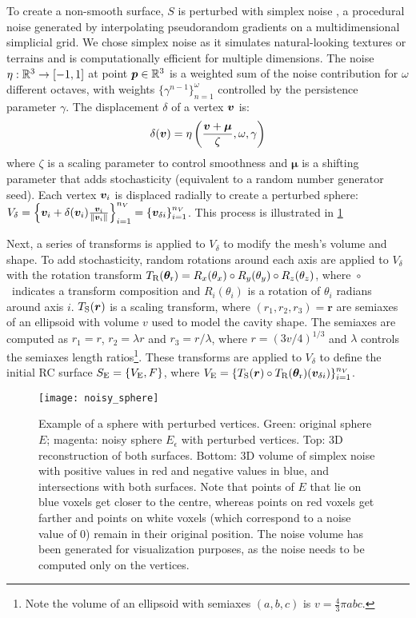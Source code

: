 To create a non-smooth surface, $S$ is perturbed with simplex noise \cite{perlin_improving_2002}, a procedural noise generated by interpolating pseudorandom gradients on a multidimensional simplicial grid.
We chose simplex noise as it simulates natural-looking textures or terrains and is computationally efficient for multiple dimensions.
The noise $\eta : \mathbb{R}^3 \to [-1, 1]$ at point $\bm{p} \in \mathbb{R}^3$ is a weighted sum of the noise contribution for $\omega$ different octaves, with weights $\{\gamma ^ {n - 1}\}_{n = 1}^{\omega}$ controlled by the persistence parameter $\gamma$.
The displacement $\delta$ of a vertex $\bm{v}$ is:
\begin{equation}
  \delta(\bm{v})
  = \eta \left( \frac{\bm{v} + \bm{\mu} }{\zeta}, \omega, \gamma \right)
\end{equation}
where
$\zeta$ is a scaling parameter to control smoothness
and $\bm{\mu}$ is a shifting parameter that adds stochasticity
(equivalent to a random number generator seed).
%
Each vertex $\bm{v}_i$ is displaced radially to create a perturbed sphere:
$
V_{\delta}
  = \left\{
  \bm{v}_i
  + \delta(\bm{v}_i)
  \frac{\bm{v}_i}{\|\bm{v}_i\|}
  \right\}
  _{i = 1}^{n_V}
  = \left\{
  \bm{v}_{\delta i}
  \right\}
  _{i = 1}^{n_V}
$.
This process is illustrated in \cref{fig:noisy_sphere}

Next, a series of transforms is applied to $V_{\delta}$ to modify the mesh's volume and shape.
To add stochasticity, random rotations around each axis are applied to $V_{\delta}$ with the rotation transform
$T_{\text{R}}(\bm{\theta}_{\text{r}}) = R_x(\theta_x) \circ R_y(\theta_y) \circ R_z(\theta_z)$,
where~$\circ$~indicates a transform composition and
$R_i(\theta_i)$ is a rotation of $\theta_i$ radians around axis $i$.
$T_{\text{S}}(\bm{r})$ is a scaling transform,
where $(r_1, r_2, r_3) = \bm{r}$ are semiaxes of an ellipsoid
with volume $v$ used to model the cavity shape.
The semiaxes are computed as
$r_1 = r$, $r_2 = \lambda r$ and $r_3 = r /\lambda$,
where $r = (3 v / 4)^{1/3}$ and
$\lambda$ controls the semiaxes length ratios\footnote{
  Note the volume of an ellipsoid with semiaxes $(a, b, c)$ is $v = \frac{4}{3} \pi a b c$.
}.
These transforms are applied to $V_{\delta}$ to define the initial \ac{RC} surface $S_{\text{E}} = \{ V_{\text{E}}, F \}$, where
$V_{\text{E}} =
\{
  T_{\text{S}}(\bm{r})
  \circ T_{\text{R}}(\bm{\theta}_{\text{r}})(
    \bm{v}_{\delta i})
\}
_{i = 1}^{n_V}
$.


\begin{figure}
  \centering
  \texttt{[image: noisy\_sphere]}
  \caption[Example of a sphere with perturbed vertices]{
    Example of a sphere with perturbed vertices.
    Green: original sphere $E$;
    magenta: noisy sphere $E_\epsilon$ with perturbed vertices.
    Top: 3D reconstruction of both surfaces.
    Bottom: 3D volume of simplex noise with positive values in red and negative values in blue, and intersections with both surfaces.
    Note that points of $E$ that lie on blue voxels get closer to the centre, whereas points on red voxels get farther and points on white voxels (which correspond to a noise value of 0) remain in their original position.
    The noise volume has been generated for visualization purposes, as the noise needs to be computed only on the vertices.}
  \label{fig:noisy_sphere}
\end{figure}


